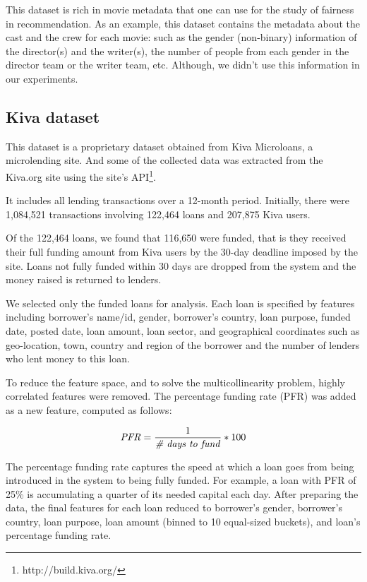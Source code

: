         This dataset is rich in movie metadata that one can use for the study of fairness in recommendation. As an example, this dataset contains the metadata about the cast and the crew for each movie: such as the gender (non-binary) information of the director(s) and the writer(s), the number of people from each gender in the director team or the writer team, etc. Although, we didn't use this information in our experiments.

    \subsection{Kiva dataset}
    This dataset is a proprietary dataset obtained from Kiva Microloans, a microlending site. And some of the collected data was extracted from the Kiva.org site using the site's API\footnote{http://build.kiva.org/}.
    
    It includes all lending transactions over a 12-month period. Initially, there were 1,084,521 transactions involving 122,464 loans and 207,875 Kiva users.
    
    Of the 122,464 loans, we found that 116,650 were funded, that is they received their full funding amount from Kiva users by the 30-day deadline imposed by the site. Loans not fully funded within 30 days are dropped from the system and the money raised is returned to lenders.
    
    We selected only the funded loans for analysis. Each loan is specified by features including borrower's name/id, gender, borrower's country, loan purpose, funded date, posted date, loan amount, loan sector, and geographical coordinates such as geo-location, town, country and region of the borrower and the number of lenders who lent money to this loan.
    
    To reduce the feature space, and to solve the multicollinearity problem, highly correlated features were removed. The percentage funding rate (PFR) was added as a new feature, computed as follows:
    
    \begin{equation}
     \mbox{\textit{PFR}} =  \frac{1}{\mbox{\textit{{\#} days to fund}}} * 100 
    \end{equation}
    
    The percentage funding rate captures the speed at which a loan goes from being introduced in the system to being fully funded. For example, a loan with PFR of 25\% is accumulating a quarter of its needed capital each day. After preparing the data, the final features for each loan reduced to borrower's gender, borrower's country, loan purpose, loan amount (binned to 10 equal-sized buckets), and loan's percentage funding rate. 
    
